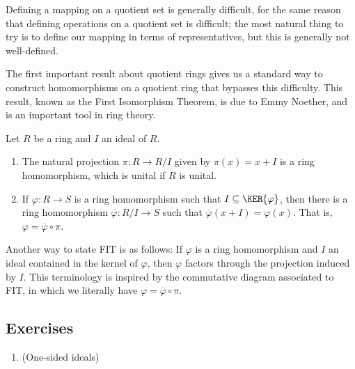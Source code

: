 \documentclass{article}
\begin{document}
Defining a mapping on a quotient set is generally difficult, for the same reason that defining operations on a quotient set is difficult; the most natural thing to try is to define our mapping in terms of representatives, but this is generally not well-defined.

The first important result about quotient rings gives us a standard way to construct homomorphisms on a quotient ring that bypasses this difficulty. This result, known as the First Isomorphism Theorem, is due to Emmy Noether, and is an important tool in ring theory.

\begin{prop}
Let $R$ be a ring and $I$ an ideal of $R$.
\begin{enumerate}
\item The natural projection $\pi : R \rightarrow R/I$ given by $\pi(x) = x+I$ is a ring homomorphism, which is unital if $R$ is unital.
\item If $\varphi : R \rightarrow S$ is a ring homomorphism such that $I \subseteq \KER{\varphi}$, then there is a ring homomorphism $\overline{\varphi} : R/I \rightarrow S$ such that $\overline{\varphi}(x + I) = \varphi(x)$. That is, $\varphi = \overline{\varphi} \circ \pi$.
\end{enumerate}
\end{prop}

Another way to state FIT is as follows: If $\varphi$ is a ring homomorphism and $I$ an ideal contained in the kernel of $\varphi$, then $\varphi$ factors through the projection induced by $I$. This terminology is inspired by the commutative diagram associated to FIT, in which we literally have $\varphi = \overline{\varphi} \circ \pi$.

\subsection*{Exercises}

\begin{enumerate}
\item (One-sided ideals)
\end{enumerate}
\end{document}
